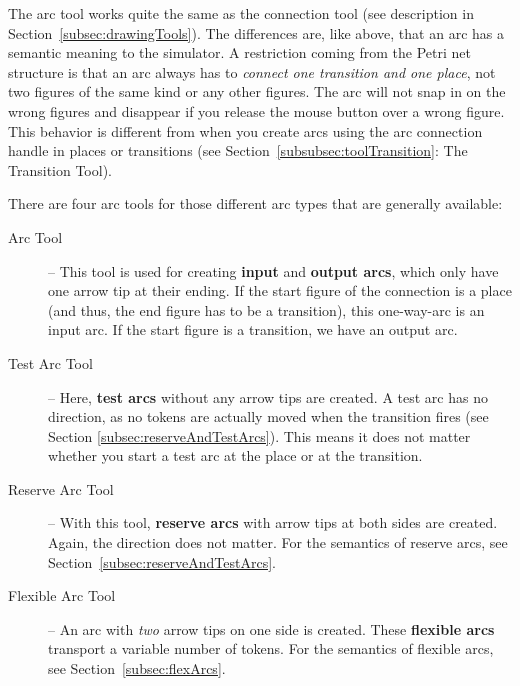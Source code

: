 The arc tool works quite the same as the connection tool (see
description in Section~\ref{subsec:drawingTools}).
The differences are, like above, that an arc has a
semantic meaning to the simulator.
A restriction coming from the Petri net structure is that
an arc always has to {\em connect one transition and one place},
not two figures of the same kind or any other figures.
The arc will not snap in on the wrong figures and disappear
if you release the mouse button over a wrong figure.
This behavior is different from when you create arcs using
the arc connection handle in places or transitions (see
Section~\ref{subsubsec:toolTransition}: The Transition Tool).

There are four arc tools for those different arc types that
are generally available:
\begin{description}
\item[Arc Tool]
 -- This tool is used for creating {\bf input} and
{\bf output arcs}, which only have one arrow tip at their ending.
If the start figure of the connection is a place (and thus, the
end figure has to be a transition), this one-way-arc is an
input arc. If the start figure is a transition, we have an
output arc.

\item[Test Arc Tool]
-- Here, {\bf test arcs} without any arrow tips
are created. A test
arc has no direction, as no tokens are actually moved when the
transition fires (see Section \ref{subsec:reserveAndTestArcs}).
This means it does not matter whether you start a test arc
at the place or at the transition.

\item[Reserve Arc Tool]
-- With this tool, {\bf reserve arcs} with
arrow tips at both sides are created. Again, the direction does
not matter. For the semantics of reserve arcs, see
Section~\ref{subsec:reserveAndTestArcs}.

\item[Flexible Arc Tool]
-- An arc with \emph{two} arrow tips on one side is created.
These {\bf flexible arcs} transport a variable number of tokens.
For the semantics of flexible arcs, see
Section~\ref{subsec:flexArcs}.
\end{description}

